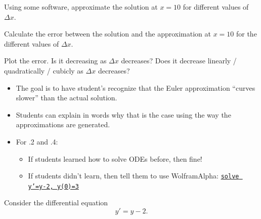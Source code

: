 	\begin{parts}
		\item Using some software, approximate the solution at $x=10$ for different values of $\Delta x$.
		\item Calculate the error between the solution and the approximation at $x=10$ for the different values of $\Delta x$.
		\item Plot the error. Is it decreasing as $\Delta x$ decreases? Does it decrease linearly / quadratically / cubicly as $\Delta x$ decreases?		
	\end{parts}

\bookonlynewpage


\begin{annotation}
	\begin{goals}
		\begin{itemize}
			\item The goal is to have student's recognize that the Euler approximation ``curves slower'' than the actual solution.
			\item Students can explain in words why that is the case using the way the approximations are generated.\\

			\item For .2 and .4: 
			\begin{itemize}%
				\item If students learned how to solve ODEs before, then fine!
				\item If students didn't learn, then tell them to use WolframAlpha: \href{http://www.wolframalpha.com/input/?i=solve+y'=y-2,y(0)=3}{\tt solve y'=y-2, y(0)=3}
			\end{itemize}%
		\end{itemize}
	\end{goals}
\end{annotation}
\question
	Consider the differential equation
	$$ y' = y - 2 .$$
	
